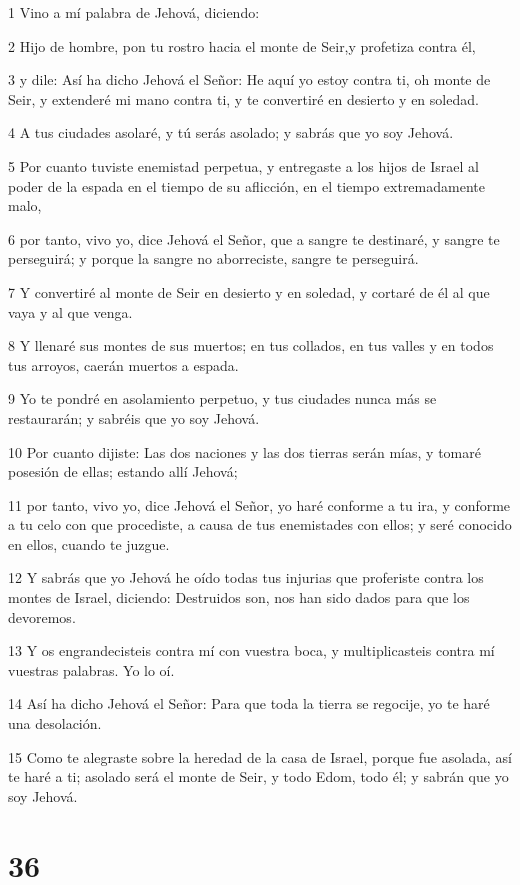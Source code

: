 \par 1 Vino a mí palabra de Jehová, diciendo:
\par 2 Hijo de hombre, pon tu rostro hacia el monte de Seir,y profetiza contra él,
\par 3 y dile: Así ha dicho Jehová el Señor: He aquí yo estoy contra ti, oh monte de Seir, y extenderé mi mano contra ti, y te convertiré en desierto y en soledad.
\par 4 A tus ciudades asolaré, y tú serás asolado; y sabrás que yo soy Jehová.
\par 5 Por cuanto tuviste enemistad perpetua, y entregaste a los hijos de Israel al poder de la espada en el tiempo de su aflicción, en el tiempo extremadamente malo,
\par 6 por tanto, vivo yo, dice Jehová el Señor, que a sangre te destinaré, y sangre te perseguirá; y porque la sangre no aborreciste, sangre te perseguirá.
\par 7 Y convertiré al monte de Seir en desierto y en soledad, y cortaré de él al que vaya y al que venga.
\par 8 Y llenaré sus montes de sus muertos; en tus collados, en tus valles y en todos tus arroyos, caerán muertos a espada.
\par 9 Yo te pondré en asolamiento perpetuo, y tus ciudades nunca más se restaurarán; y sabréis que yo soy Jehová.
\par 10 Por cuanto dijiste: Las dos naciones y las dos tierras serán mías, y tomaré posesión de ellas; estando allí Jehová;
\par 11 por tanto, vivo yo, dice Jehová el Señor, yo haré conforme a tu ira, y conforme a tu celo con que procediste, a causa de tus enemistades con ellos; y seré conocido en ellos, cuando te juzgue.
\par 12 Y sabrás que yo Jehová he oído todas tus injurias que proferiste contra los montes de Israel, diciendo: Destruidos son, nos han sido dados para que los devoremos.
\par 13 Y os engrandecisteis contra mí con vuestra boca, y multiplicasteis contra mí vuestras palabras. Yo lo oí.
\par 14 Así ha dicho Jehová el Señor: Para que toda la tierra se regocije, yo te haré una desolación.
\par 15 Como te alegraste sobre la heredad de la casa de Israel, porque fue asolada, así te haré a ti; asolado será el monte de Seir, y todo Edom, todo él; y sabrán que yo soy Jehová. 

\chapter{36}

